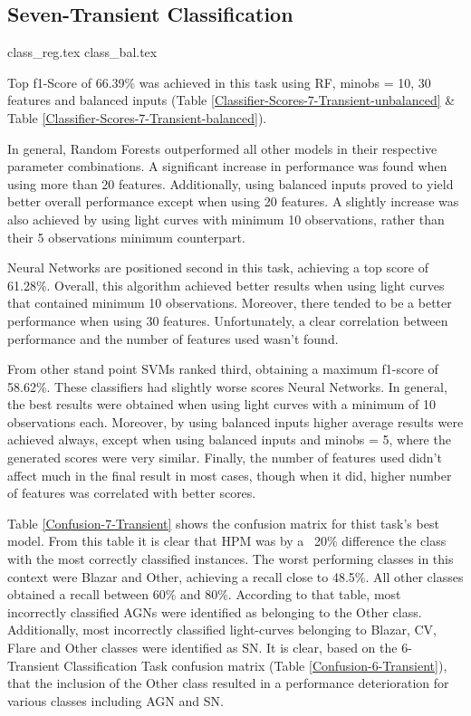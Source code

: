 \documentclass[a4paper,fleqn,usenatbib]{mnras}
\begin{document}

\subsection{Seven-Transient Classification}

{class_reg.tex}
{class_bal.tex}

Top f1-Score of 66.39\% was achieved in this task using RF, min\textunderscore obs = 10, 30 features and balanced inputs (Table \ref{Classifier-Scores-7-Transient-unbalanced} \& Table \ref{Classifier-Scores-7-Transient-balanced}).

In general, Random Forests outperformed all other models in their respective parameter combinations. A significant increase in performance was found when using more than 20 features. Additionally, using balanced inputs proved to yield better overall performance except when using 20 features. A slightly increase was also achieved by using light curves with minimum 10 observations, rather than their 5 observations minimum counterpart.

Neural Networks are positioned second in this task, achieving a top score of 61.28\%. Overall, this algorithm achieved better results when using light curves that contained minimum 10 observations. Moreover, there tended to be a better performance when using 30 features. Unfortunately, a clear correlation between performance and the number of features used wasn't found.

From other stand point SVMs ranked third, obtaining a maximum f1-score of 58.62\%. These classifiers had slightly worse scores Neural Networks. In general, the best results were obtained when using light curves with a minimum of 10 observations each. Moreover, by using balanced inputs higher average results were achieved always, except when using balanced inputs and min\textunderscore obs = 5, where the generated scores were very similar. Finally, the number of features used didn't affect much in the final result in most cases, though when it did, higher number of features was correlated with better scores.

Table \ref{Confusion-7-Transient} shows the confusion matrix for thist task's best model. From this table it is clear that HPM was by a ~20\% difference the class with the most correctly classified instances. The worst performing classes in this context were Blazar and Other, achieving a recall close to 48.5\%. All other classes obtained a recall between 60\% and 80\%. According to that table, most incorrectly classified AGNs were identified as belonging to the Other class. Additionally, most incorrectly classified light-curves belonging to Blazar, CV, Flare and Other classes were identified as SN. It is clear, based on the 6-Transient Classification Task confusion matrix (Table \ref{Confusion-6-Transient}), that the inclusion of the Other class resulted in a performance deterioration for various classes including AGN and SN.
\end{document}
